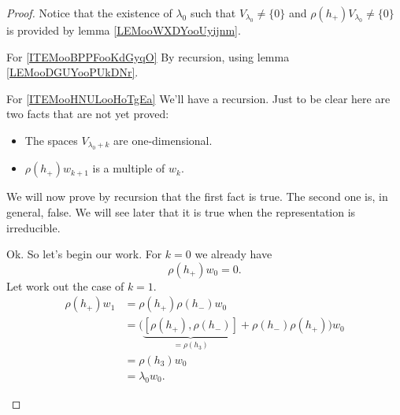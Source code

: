 \begin{proof}
    Notice that the existence of \( \lambda_0\) such that \( V_{\lambda_0}\neq \{ 0 \}\) and \( \rho(h_+)V_{\lambda_0}\neq\{ 0 \}\) is provided by lemma \ref{LEMooWXDYooUyijnm}.
    \begin{subproof}
    \item[For \ref{ITEMooBPPFooKdGyqO}]
        By recursion, using lemma \ref{LEMooDGUYooPUkDNr}.
    \item[For \ref{ITEMooHNULooHoTgEa}]
        We'll have a recursion. Just to be clear here are two facts that are not yet proved:
        \begin{itemize}
            \item The spaces \( V_{\lambda_0+k}\) are one-dimensional.
            \item \( \rho(h_+)w_{k+1}\) is a multiple of \( w_k\).
        \end{itemize}
        We will now prove by recursion that the first fact is true. The second one is, in general, false. We will see later that it is true when the representation is irreducible.

        Ok. So let's begin our work. For \( k=0\) we already have
        \begin{equation}
            \rho(h_+)w_0=0.
        \end{equation}
        Let work out the case of \( k=1\).
        \begin{subequations}
            \begin{align}
                \rho(h_+)w_1&=\rho(h_+)\rho(h_-)w_0\\
                &=\big( \underbrace{[\rho(h_+),\rho(h_-)]}_{=\rho(h_3)}+\rho(h_-)\rho(h_+) \big)w_0\\
                &=\rho(h_3)w_0\\
                &=\lambda_0w_0.
            \end{align}
        \end{subequations}
        

\end{subproof}
\end{proof}
